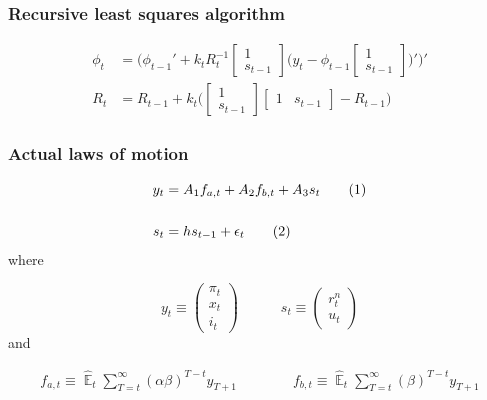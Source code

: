 \documentclass[11pt]{beamer}
\newcommand\numberthis{\addtocounter{equation}{1}\tag{\theequation}} %
\DeclareMathOperator{\E}{\mathbb{E}}
\begin{document}
\begin{frame}[plain]  %
	\frametitle{Recursive least squares algorithm}
	\label{RLS}


\begin{align}
\phi_t  & = \bigg( \phi_{t-1}' + k_t R_t^{-1}\begin{bmatrix} 1 \\ s_{t-1} \end{bmatrix}\bigg(y_{t} - \phi_{t-1} \begin{bmatrix} 1 \\ s_{t-1} \end{bmatrix} \bigg)' \bigg)' \\
R_t &= R_{t-1} +  k_t \bigg( \begin{bmatrix} 1 \\ s_{t-1} \end{bmatrix} \begin{bmatrix} 1 & s_{t-1} \end{bmatrix}  - R_{t-1} \bigg)
\end{align}


\vfill

\hyperlink{RLS_special}{}	


\end{frame}


\begin{frame}[plain]  %
	\frametitle{Actual laws of motion}
	\label{ALMs}

 \begin{align*}
y_t & = A_1 f_{a,t} + A_2 f_{b,t} + A_3 s_t \label{LOM_LR} \numberthis \\
\\
s_t & = h s_{t-1} + \epsilon_t \label{exog} \numberthis
\end{align*}
where

\begin{equation}
 y_t \equiv \begin{pmatrix} \pi_t \\ x_t \\ i_t
 \end{pmatrix} 
 \quad \quad \quad 
  s_t  \equiv \begin{pmatrix} r_t^n \\ u_t 
 \end{pmatrix} 
\end{equation}
and

  \begin{align}
f_{a,t}  \equiv  \hat{\E}_t\sum_{T=t}^{\infty} (\alpha\beta)^{T-t } y_{T+1} \quad \quad \quad \quad 
f_{b,t}  \equiv \hat{\E}_t\sum_{T=t}^{\infty} (\beta)^{T-t } y_{T+1} \label{fafb}
\end{align}

\hyperlink{aggregate_LOMS}{}	


\end{frame}
\end{document}
